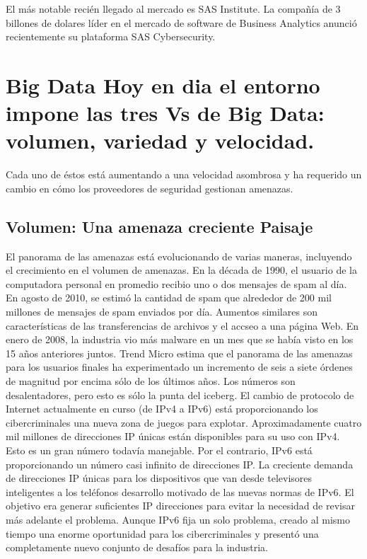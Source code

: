 \documentclass[journal]{IEEEtran}
\begin{document}
El más notable recién llegado al mercado es SAS Institute. La compañía de 3 billones de dolares líder en el mercado de software de Business Analytics anunció recientemente su plataforma SAS Cybersecurity.

\section{Big Data
Hoy en dia el entorno impone las tres Vs de Big Data: volumen, variedad y velocidad.}

Cada uno de éstos está aumentando a una velocidad asombrosa y ha requerido un cambio en cómo los proveedores de seguridad gestionan amenazas.

\subsection{Volumen: Una amenaza creciente Paisaje}

El panorama de las amenazas está evolucionando de varias maneras, incluyendo el crecimiento en el volumen de amenazas. En la década de 1990, el usuario de la computadora personal en promedio recibio uno o dos mensajes de spam al día. En agosto de 2010, se estimó la cantidad de spam que alrededor de 200 mil millones de mensajes de spam enviados por día. Aumentos similares son características de las transferencias de archivos y el accseo a una página Web. En enero de 2008, la industria vio más malware en un mes que se había visto en los 15 años anteriores juntos. Trend Micro estima que el panorama de las amenazas para los usuarios finales ha experimentado un incremento de seis a siete órdenes de magnitud por encima sólo de los últimos años. Los números son desalentadores, pero esto es sólo la punta del iceberg. El cambio de protocolo de Internet actualmente en curso (de IPv4 a IPv6) está proporcionando los cibercriminales una nueva zona de juegos para explotar. Aproximadamente cuatro mil millones de direcciones IP únicas están disponibles para su uso con IPv4. Esto es un gran número todavía manejable. Por el contrario, IPv6 está proporcionando un número casi infinito de direcciones IP. La creciente demanda de direcciones IP únicas para los dispositivos que van desde televisores inteligentes a los teléfonos desarrollo motivado de las nuevas normas de IPv6. El objetivo era generar suficientes IP direcciones para evitar la necesidad de revisar más adelante el problema. Aunque IPv6 fija un solo problema, creado al mismo tiempo una enorme oportunidad para los cibercriminales y presentó una completamente nuevo conjunto de desafíos para la industria.
\end{document}

